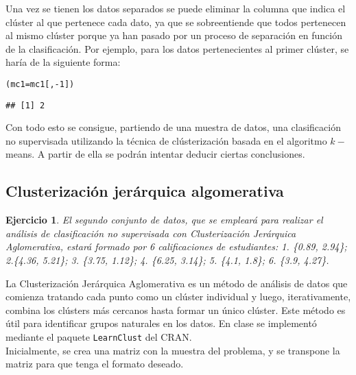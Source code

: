 \documentclass[12pt]{report}\usepackage[]{graphicx}\usepackage[dvipsnames]{xcolor}
\makeatletter
\newcommand{\hlnum}[1]{\textcolor[rgb]{0.686,0.059,0.569}{#1}}%
\newcommand{\hlopt}[1]{\textcolor[rgb]{0,0,0}{#1}}%
\newcommand{\hlstd}[1]{\textcolor[rgb]{0.345,0.345,0.345}{#1}}%
\newcommand{\hlkwb}[1]{\textcolor[rgb]{0.69,0.353,0.396}{#1}}%
\newenvironment{kframe}{%
 \def\at@end@of@kframe{}%
 \ifinner\ifhmode%
  \def\at@end@of@kframe{\end{minipage}}%
  \begin{minipage}{\columnwidth}%
 \fi\fi%
 \def\FrameCommand##1{\hskip\@totalleftmargin \hskip-\fboxsep
 \colorbox{shadecolor}{##1}\hskip-\fboxsep
     \hskip-\linewidth \hskip-\@totalleftmargin \hskip\columnwidth}%
 \MakeFramed {\advance\hsize-\width
   \@totalleftmargin\z@ \linewidth\hsize
   \@setminipage}}%
 {\par\unskip\endMakeFramed%
 \at@end@of@kframe}
\newenvironment{knitrout}{}{} %
\newtheorem{exercise}{Ejercicio}[section]
\makeatother
\begin{document}
				Una vez se tienen los datos separados se puede eliminar la columna que indica el clúster al que pertenece cada dato, ya que se sobreentiende que todos pertenecen al mismo clúster porque ya han pasado por un proceso de separación en función de la clasificación. Por ejemplo, para los datos pertenecientes al primer clúster, se haría de la siguiente forma:
				
\begin{knitrout}
\color{fgcolor}\begin{kframe}
\begin{alltt}
\hlstd{(mc1} \hlkwb{=} \hlstd{mc1[,}\hlopt{-}\hlnum{1}\hlstd{])}
\end{alltt}
\begin{verbatim}
## [1] 2
\end{verbatim}
\end{kframe}
\end{knitrout}
				
				Con todo esto se consigue, partiendo de una muestra de datos, una clasificación no supervisada utilizando la técnica de clústerización basada en el algoritmo $k-$means. A partir de ella se podrán intentar deducir ciertas conclusiones.
		
			\subsection{Clusterización jerárquica algomerativa}
		
				\begin{exercise}
					El segundo conjunto de datos, que se empleará para realizar el análisis de clasificación no supervisada con Clusterización Jerárquica Aglomerativa, estará formado por 6 calificaciones de estudiantes: 1. \{0.89, 2.94\}; 2.\{4.36, 5.21\}; 3. \{3.75, 1.12\}; 4. \{6.25, 3.14\}; 5. \{4.1, 1.8\}; 6. \{3.9, 4.27\}.
				\end{exercise}
				
				La Clusterización Jerárquica Aglomerativa es un método de análisis de datos que comienza tratando cada punto como un clúster individual y luego, iterativamente, combina los clústers más cercanos hasta formar un único clúster. Este método es útil para identificar grupos naturales en los datos. En clase se implementó mediante el paquete \texttt{LearnClust} del CRAN.\\
				
				Inicialmente, se crea una matriz con la muestra del problema, y se transpone la matriz para que tenga el formato deseado.
				
\end{document}
